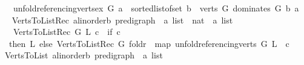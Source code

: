 \begin{isabellebody}
\ \ \ {\isachardoublequoteopen}unfold{\isacharunderscore}{\kern0pt}referencing{\isacharunderscore}{\kern0pt}verts{\isacharunderscore}{\kern0pt}ex\ G\ a\ {\isacharequal}{\kern0pt}\ sorted{\isacharunderscore}{\kern0pt}list{\isacharunderscore}{\kern0pt}of{\isacharunderscore}{\kern0pt}set\ {\isacharparenleft}{\kern0pt}{\isacharbraceleft}{\kern0pt}b\ {\isasymin}\ verts\ G{\isachardot}{\kern0pt}\ dominates\ G\ b\ a{\isacharbraceright}{\kern0pt}{\isacharparenright}{\kern0pt}{\isachardoublequoteclose}\ \ \isanewline
\isanewline
{}\isamarkupfalse%
\ Verts{\isacharunderscore}{\kern0pt}To{\isacharunderscore}{\kern0pt}List{\isacharunderscore}{\kern0pt}Rec{\isacharcolon}{\kern0pt}{\isacharcolon}{\kern0pt}\ {\isachardoublequoteopen}{\isacharparenleft}{\kern0pt}{\isacharprime}{\kern0pt}a{\isacharcolon}{\kern0pt}{\isacharcolon}{\kern0pt}linorder{\isacharcomma}{\kern0pt}{\isacharprime}{\kern0pt}b{\isacharparenright}{\kern0pt}\ pre{\isacharunderscore}{\kern0pt}digraph\ {\isasymRightarrow}\ {\isacharprime}{\kern0pt}a\ list\ {\isasymRightarrow}\ nat\ {\isasymRightarrow}\ {\isacharprime}{\kern0pt}a\ list{\isachardoublequoteclose}\isanewline
\ \ \ {\isachardoublequoteopen}Verts{\isacharunderscore}{\kern0pt}To{\isacharunderscore}{\kern0pt}List{\isacharunderscore}{\kern0pt}Rec\ G\ L\ c\ {\isacharequal}{\kern0pt}\ {\isacharparenleft}{\kern0pt}if\ {\isacharparenleft}{\kern0pt}c\ {\isasymle}\ {}{\isacharparenright}{\kern0pt}\isanewline
\ \ then\ L\ else\ Verts{\isacharunderscore}{\kern0pt}To{\isacharunderscore}{\kern0pt}List{\isacharunderscore}{\kern0pt}Rec\ G\ {\isacharparenleft}{\kern0pt}foldr\ {\isacharparenleft}{\kern0pt}{\isacharat}{\kern0pt}{\isacharparenright}{\kern0pt}\ {\isacharparenleft}{\kern0pt}map\ {\isacharparenleft}{\kern0pt}unfold{\isacharunderscore}{\kern0pt}referencing{\isacharunderscore}{\kern0pt}verts\ G{\isacharparenright}{\kern0pt}\ L{\isacharparenright}{\kern0pt}\ {\isacharbrackleft}{\kern0pt}{\isacharbrackright}{\kern0pt}{\isacharparenright}{\kern0pt}\ {\isacharparenleft}{\kern0pt}c\ {\isacharminus}{\kern0pt}\ {}{\isacharparenright}{\kern0pt}{\isacharparenright}{\kern0pt}{\isachardoublequoteclose}\isanewline
\ \isanewline
{}\isamarkupfalse%
\ Verts{\isacharunderscore}{\kern0pt}To{\isacharunderscore}{\kern0pt}List{\isacharcolon}{\kern0pt}{\isacharcolon}{\kern0pt}\ {\isachardoublequoteopen}{\isacharparenleft}{\kern0pt}{\isacharprime}{\kern0pt}a{\isacharcolon}{\kern0pt}{\isacharcolon}{\kern0pt}linorder{\isacharcomma}{\kern0pt}{\isacharprime}{\kern0pt}b{\isacharparenright}{\kern0pt}\ pre{\isacharunderscore}{\kern0pt}digraph\ {\isasymRightarrow}\ {\isacharprime}{\kern0pt}a\ list{\isachardoublequoteclose}\isanewline

\end{isabellebody}
